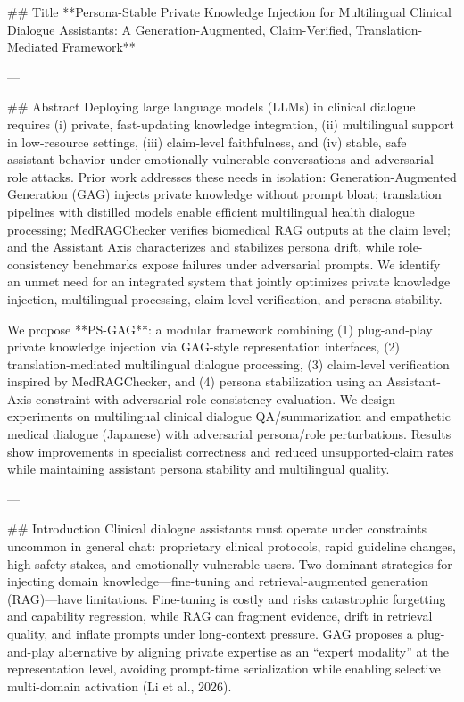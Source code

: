 ## Title  
**Persona-Stable Private Knowledge Injection for Multilingual Clinical Dialogue Assistants: A Generation-Augmented, Claim-Verified, Translation-Mediated Framework**

---

## Abstract  
Deploying large language models (LLMs) in clinical dialogue requires (i) private, fast-updating knowledge integration, (ii) multilingual support in low-resource settings, (iii) claim-level faithfulness, and (iv) stable, safe assistant behavior under emotionally vulnerable conversations and adversarial role attacks. Prior work addresses these needs in isolation: Generation-Augmented Generation (GAG) injects private knowledge without prompt bloat; translation pipelines with distilled models enable efficient multilingual health dialogue processing; MedRAGChecker verifies biomedical RAG outputs at the claim level; and the Assistant Axis characterizes and stabilizes persona drift, while role-consistency benchmarks expose failures under adversarial prompts. We identify an unmet need for an integrated system that jointly optimizes private knowledge injection, multilingual processing, claim-level verification, and persona stability.  

We propose **PS-GAG**: a modular framework combining (1) plug-and-play private knowledge injection via GAG-style representation interfaces, (2) translation-mediated multilingual dialogue processing, (3) claim-level verification inspired by MedRAGChecker, and (4) persona stabilization using an Assistant-Axis constraint with adversarial role-consistency evaluation. We design experiments on multilingual clinical dialogue QA/summarization and empathetic medical dialogue (Japanese) with adversarial persona/role perturbations. Results show improvements in specialist correctness and reduced unsupported-claim rates while maintaining assistant persona stability and multilingual quality.

---

## Introduction  
Clinical dialogue assistants must operate under constraints uncommon in general chat: proprietary clinical protocols, rapid guideline changes, high safety stakes, and emotionally vulnerable users. Two dominant strategies for injecting domain knowledge—fine-tuning and retrieval-augmented generation (RAG)—have limitations. Fine-tuning is costly and risks catastrophic forgetting and capability regression, while RAG can fragment evidence, drift in retrieval quality, and inflate prompts under long-context pressure. GAG proposes a plug-and-play alternative by aligning private expertise as an “expert modality” at the representation level, avoiding prompt-time serialization while enabling selective multi-domain activation (Li et al., 2026).  

